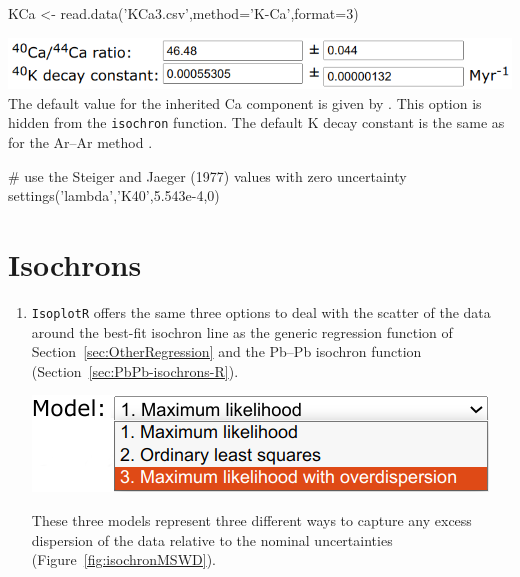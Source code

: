 \begin{refsection}
\begin{script}
KCa <- read.data('KCa3.csv',method='K-Ca',format=3)
\end{script}

\noindent\includegraphics[width=.7\linewidth]{../figures/KCaLambda.png}\\

\noindent The default value for the inherited Ca component is given by
\citet{moore1972}. This option is hidden from the \texttt{isochron}
function. The default K decay constant is the same as for the Ar--Ar
method \citep{renne2011}.

\begin{script}
# use the Steiger and Jaeger (1977) values with zero uncertainty
settings('lambda','K40',5.543e-4,0)
\end{script}

\section{Isochrons}\label{sec:ArAr-isochrons-R}

\begin{enumerate}

\item \texttt{IsoplotR} offers the same three options to deal with the
  scatter of the data around the best-fit isochron line as the generic
  regression function of Section~\ref{sec:OtherRegression} and the
  Pb--Pb isochron function (Section~\ref{sec:PbPb-isochrons-R}).

\noindent\begin{minipage}[t]{.45\linewidth}
\strut\vspace*{-\baselineskip}\newline
\includegraphics[width=\linewidth]{../figures/ArArIsochronModels.png}
\end{minipage}
\begin{minipage}[t]{.55\linewidth}
  These three models represent three different ways to capture any
  excess dispersion of the data relative to the nominal uncertainties
  (Figure~\ref{fig:isochronMSWD}).
\end{minipage}


\end{enumerate}
\end{refsection}
